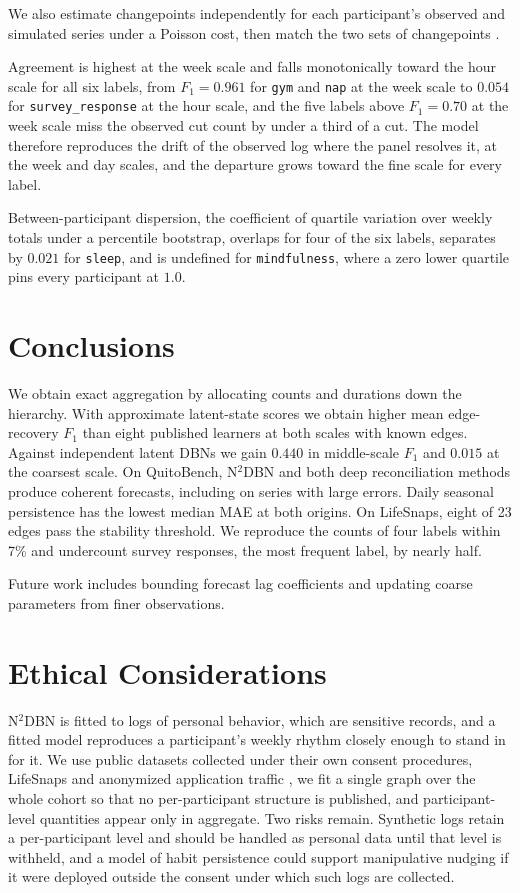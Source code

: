 \documentclass[sigconf]{acmart}
\begin{document}
We also estimate changepoints independently for each participant's observed and simulated series under a Poisson cost, then match the two sets of changepoints \citep{killick_optimal_2012}.

Agreement is highest at the week scale and falls monotonically toward the hour scale for all six labels, from $F_1=0.961$ for \texttt{gym} and \texttt{nap} at the week scale to $0.054$ for \texttt{survey\_response} at the hour scale, and the five labels above $F_1=0.70$ at the week scale miss the observed cut count by under a third of a cut. The model therefore reproduces the drift of the observed log where the panel resolves it, at the week and day scales, and the departure grows toward the fine scale for every label.

Between-participant dispersion, the coefficient of quartile variation over weekly totals under a percentile bootstrap, overlaps for four of the six labels, separates by $0.021$ for \texttt{sleep}, and is undefined for \texttt{mindfulness}, where a zero lower quartile pins every participant at $1.0$.

\section{Conclusions}
\label{sec:conclusions}

We obtain exact aggregation by allocating counts and durations down the hierarchy. With approximate latent-state scores we obtain higher mean edge-recovery \(F_1\) than eight published learners at both scales with known edges. Against independent latent DBNs we gain \(0.440\) in middle-scale \(F_1\) and \(0.015\) at the coarsest scale. On QuitoBench, N$^2$DBN and both deep reconciliation methods produce coherent forecasts, including on series with large errors. Daily seasonal persistence has the lowest median MAE at both origins. On LifeSnaps, eight of 23 edges pass the stability threshold. We reproduce the counts of four labels within 7\% and undercount survey responses, the most frequent label, by nearly half.

Future work includes bounding forecast lag coefficients and updating coarse parameters from finer observations.

\section{Ethical Considerations}

N$^2$DBN is fitted to logs of personal behavior, which are sensitive records, and a fitted model reproduces a participant's weekly rhythm closely enough to stand in for it. We use public datasets collected under their own consent procedures, LifeSnaps \citep{yfantidou_lifesnaps_2022} and anonymized application traffic \citep{xue_quitobench_2026}, we fit a single graph over the whole cohort so that no per-participant structure is published, and participant-level quantities appear only in aggregate. Two risks remain. Synthetic logs retain a per-participant level and should be handled as personal data until that level is withheld, and a model of habit persistence could support manipulative nudging if it were deployed outside the consent under which such logs are collected.
\end{document}
